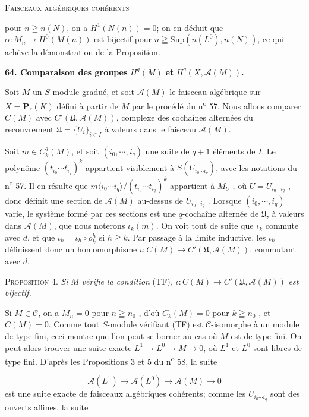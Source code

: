 

\textsc{Faisceaux algébriques cohérents}

 pour $n \geqq n(N)$, on a $H^1(N(n)) = 0$; on en déduit que $\alpha : M_n \to H^0(M(n))$ est bijectif pour $n \geqq \mathrm{Sup}(n(L^0), n(N))$, ce qui achève la démonstration de la Proposition.


\textbf{64. Comparaison des groupes} $H^q(M)$ \textbf{et} $H^q(X, \mathcal{A}(M))$\textbf{.}

Soit $M$ un $S$-module gradué, et soit $\mathcal{A}(M)$ le faisceau algébrique sur $X = \mathbf{P}_r(K)$ défini à partir de $M$ par le procédé du n\textsuperscript{o} 57. Nous allons comparer $C(M)$ avec $C'(\mathfrak{U}, \mathcal{A}(M))$, complexe des cochaînes alternées du recouvrement $\mathfrak{U} = \{U_i\}_{i \in I}$ à valeurs dans le faisceau $\mathcal{A}(M)$.

Soit $m \in C_k^q(M)$, et soit $(i_0 , \cdots , i_q)$ une suite de $q + 1$ éléments de $I$. Le polynôme $(t_{i_0} \cdots t_{i_q})^k$ appartient visiblement à $S(U_{i_0 \cdots i_q})$, avec les notations du n\textsuperscript{o} 57. Il en résulte que $m\langle i_0 \cdots i_q\rangle/(t_{i_0} \cdots t_{i_q})^k$ appartient à $M_U$ , où $U = U_{i_0 \cdots i_q}$ , donc définit une section de $\mathcal{A}(M)$ au-dessus de $U_{i_0 \cdots i_q}$ . Lorsque $(i_0 , \cdots , i_q)$ varie, le système formé par ces sections est une $q$-cochaîne alternée de $\mathfrak{U}$, à valeurs dans $\mathcal{A}(M)$, que nous noterons $\iota_k(m)$. On voit tout de suite que $\iota_k$ commute avec $d$, et que $\iota_k = \iota_h \circ \rho_k^h$ si $h \geqq k$. Par passage à la limite inductive, les $\iota_k$ définissent donc un homomorphisme $\iota : C(M) \to C'(\mathfrak{U}, \mathcal{A}(M))$, commutant avec $d$.

\textsc{Proposition} 4. \textit{Si} $M$ \textit{vérifie la condition} (TF)\textit{,} $\iota : C(M) \to C'(\mathfrak{U}, \mathcal{A}(M))$ \textit{est bijectif.}

Si $M \in \mathcal{C}$, on a $M_n = 0$ pour $n \geqq n_0$ , d'où $C_k(M) = 0$ pour $k \geqq n_0$ , et $C(M) = 0$. Comme tout $S$-module vérifiant (TF) est $\mathcal{C}$-isomorphe à un module de type fini, ceci montre que l'on peut se borner au cas où $M$ est de type fini. On peut alors trouver une suite exacte $L^1 \to L^0 \to M \to 0$, où $L^1$ et $L^0$ sont libres de type fini. D'après les Propositions 3 et 5 du n\textsuperscript{o} 58, la suite

\begin{equation*}
\mathcal{A}(L^1) \to \mathcal{A}(L^0) \to \mathcal{A}(M) \to 0
\end{equation*}
est une suite exacte de faisceaux algébriques cohérents; comme les $U_{i_0 \cdots i_q}$ sont des ouverts affines, la suite

